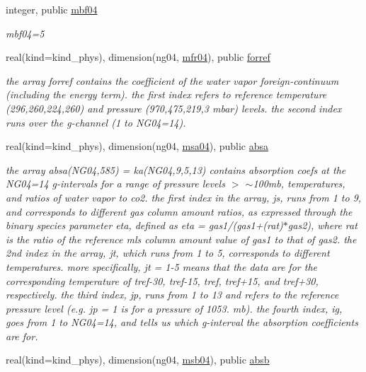 \begin{DoxyCompactItemize}
integer, public \hyperlink{group__module__radlw__kgbnn_ga768f4447809fb11206dce383a121d595}{mbf04}
\begin{DoxyCompactList}\small\item\em mbf04=5 \end{DoxyCompactList}\item 
real(kind=kind\+\_\+phys), dimension(ng04, \hyperlink{group__module__radlw__kgbnn_gab6ae25b4a793bf78ccd504685d639039}{mfr04}), public \hyperlink{group__module__radlw__kgbnn_ga816fd065291a92c13d026d38a708479b}{forref}
\begin{DoxyCompactList}\small\item\em the array forref contains the coefficient of the water vapor foreign-\/continuum (including the energy term). the first index refers to reference temperature (296,260,224,260) and pressure (970,475,219,3 mbar) levels. the second index runs over the g-\/channel (1 to N\+G04=14). \end{DoxyCompactList}\item 
real(kind=kind\+\_\+phys), dimension(ng04, \hyperlink{namespacemodule__radlw__kgb04_ac8c5caff005fd04d01009dd9e977d570}{msa04}), public \hyperlink{group__module__radlw__kgbnn_ga8d73bb6971c872e15a24a81d3917167e}{absa}
\begin{DoxyCompactList}\small\item\em the array absa(\+N\+G04,585) = ka(\+N\+G04,9,5,13) contains absorption coefs at the N\+G04=14 g-\/intervals for a range of pressure levels $>$ $\sim$100mb, temperatures, and ratios of water vapor to co2. the first index in the array, js, runs from 1 to 9, and corresponds to different gas column amount ratios, as expressed through the binary species parameter eta, defined as eta = gas1/(gas1+(rat)$\ast$gas2), where rat is the ratio of the reference mls column amount value of gas1 to that of gas2. the 2nd index in the array, jt, which runs from 1 to 5, corresponds to different temperatures. more specifically, jt = 1-\/5 means that the data are for the corresponding temperature of tref-\/30, tref-\/15, tref, tref+15, and tref+30, respectively. the third index, jp, runs from 1 to 13 and refers to the reference pressure level (e.\+g. jp = 1 is for a pressure of 1053. mb). the fourth index, ig, goes from 1 to N\+G04=14, and tells us which g-\/interval the absorption coefficients are for. \end{DoxyCompactList}\item 
real(kind=kind\+\_\+phys), dimension(ng04, \hyperlink{group__module__radlw__kgbnn_gab9ce0111a156f7b80f2adaa9f3e84a32}{msb04}), public \hyperlink{group__module__radlw__kgbnn_gaaacc55911b42c67396b5cdc4318e0d5f}{absb}

\end{DoxyCompactItemize}
